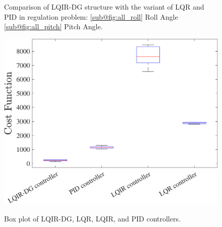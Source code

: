 \documentclass[3p]{elsarticle}
\begin{document}
\begin{figure}[H]
	\centering
	\caption{Comparison of LQIR-DG structure with the variant of LQR and PID in regulation problem: \ref{sub@fig:all_roll} Roll Angle \ref{sub@fig:all_pitch} Pitch Angle.}
	\label{fig:compare}
\end{figure}

\begin{figure}[H]
	\centering
	{\includegraphics[width=.55\linewidth]{../Figure/implementation/box_plot/lqidgvsboxplot}
	}
	\caption{Box plot of LQIR-DG, LQR, LQIR, and PID controllers.}
	\label{fig:compare_boxplot}
\end{figure}
\newpage
\end{document}
